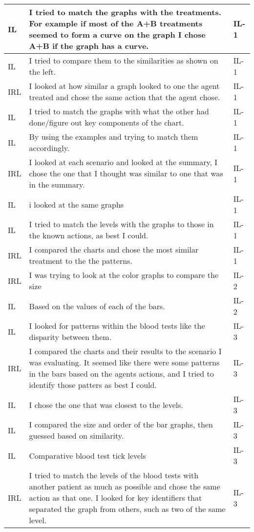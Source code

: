\documentclass{article}
\begin{document}
\begin{longtable}{ | m{0.6in} | m{5in}| m{0.6in} | }
IL & I tried to match the graphs with the treatments. For example if most of the A+B treatments seemed to form a curve on the graph I chose A+B if the graph has a curve. & IL-1 \\ \hline
IL & I tried to compare them to the similarities as shown on the left. & IL-1 \\ \hline
IRL & I looked at how similar a graph looked to one the agent treated and chose the same action that the agent chose. & IL-1 \\ \hline
IL & I tried to match the graphs with what the other had done/figure out key components of the chart. & IL-1 \\ \hline
IL & By using the examples and trying to match them accordingly. & IL-1 \\ \hline
IRL & I looked at each scenario and looked at the summary, I chose the one that I thought was similar to one that was in the summary. & IL-1 \\ \hline
IL & i looked at the same graphs & IL-1 \\ \hline
IL & I tried to match the levels with the graphs to those in the known actions, as best I could. & IL-1 \\ \hline
IRL & I compared the charts and chose the most similar treatment to the the patterns. & IL-1  \\ \hline
IRL & I was trying to look at the color graphs to compare the size & IL-2 \\ \hline
IL & Based on the values of each of the bars. & IL-2 \\ \hline
IL & I looked for patterns within the blood tests like the disparity between them. & IL-3 \\ \hline
IRL & I compared the charts and their results to the scenario I was evaluating. It seemed like there were some patterns in the bars based on the agents actions, and I tried to identify those patters as best I could. & IL-3 \\ \hline
IL & I chose the one that was closest to the levels.  & IL-3 \\ \hline
IL & I compared the size and order of the bar graphs, then guessed based on similarity. & IL-3 \\ \hline
IL & Comparative blood test tick levels & IL-3 \\ \hline
IRL & I tried to match the levels of the blood tests with another patient as much as possible and chose the same action as that one. I looked for key identifiers that separated the graph from others, such as two of the same level. & IL-3 \\ \hline

\end{longtable}
\end{document}
